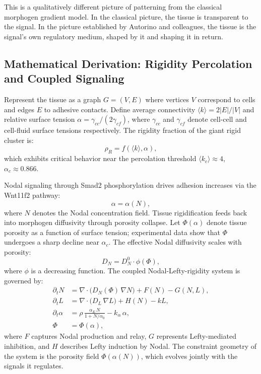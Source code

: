 \documentclass[12pt, a4paper, openany]{book}
\theoremstyle{definition}
\theoremstyle{remark}
\begin{document}
This is a qualitatively different picture of patterning from the classical morphogen gradient model. In the classical picture, the tissue is transparent to the signal. In the picture established by Autorino and colleagues, the tissue is the signal's own regulatory medium, shaped by it and shaping it in return.

\subsection*{Mathematical Derivation: Rigidity Percolation and Coupled Signaling}

Represent the tissue as a graph $G = (V, E)$ where vertices $V$ correspond to cells and edges $E$ to adhesive contacts. Define average connectivity $\langle k \rangle = 2|E|/|V|$ and relative surface tension $\alpha = \gamma_{cc}/(2\gamma_{cf})$, where $\gamma_{cc}$ and $\gamma_{cf}$ denote cell-cell and cell-fluid surface tensions respectively. The rigidity fraction of the giant rigid cluster is:
\begin{equation}
\rho_R = f\!\left(\langle k \rangle, \alpha\right),
\end{equation}
which exhibits critical behavior near the percolation threshold $\langle k_c \rangle \approx 4$, $\alpha_c \approx 0.866$.

Nodal signaling through Smad2 phosphorylation drives adhesion increases via the Wnt11f2 pathway:
\begin{equation}
\alpha = \alpha(N),
\end{equation}
where $N$ denotes the Nodal concentration field. Tissue rigidification feeds back into morphogen diffusivity through porosity collapse. Let $\Phi(\alpha)$ denote tissue porosity as a function of surface tension; experimental data show that $\Phi$ undergoes a sharp decline near $\alpha_c$. The effective Nodal diffusivity scales with porosity:
\begin{equation}
D_N = D_N^0 \cdot \phi(\Phi),
\end{equation}
where $\phi$ is a decreasing function. The coupled Nodal-Lefty-rigidity system is governed by:
\begin{align}
\partial_t N &= \nabla \cdot \big(D_N(\Phi)\,\nabla N\big) + F(N) - G(N,L), \\
\partial_t L &= \nabla \cdot \big(D_L\,\nabla L\big) + H(N) - kL, \\
\partial_t \alpha &= \rho\,\frac{\alpha_E\, N}{1 + N/\alpha_0} - k_\alpha\,\alpha, \\
\Phi &= \Phi(\alpha),
\end{align}
where $F$ captures Nodal production and relay, $G$ represents Lefty-mediated inhibition, and $H$ describes Lefty induction by Nodal. The constraint geometry of the system is the porosity field $\Phi(\alpha(N))$, which evolves jointly with the signals it regulates.
\end{document}
